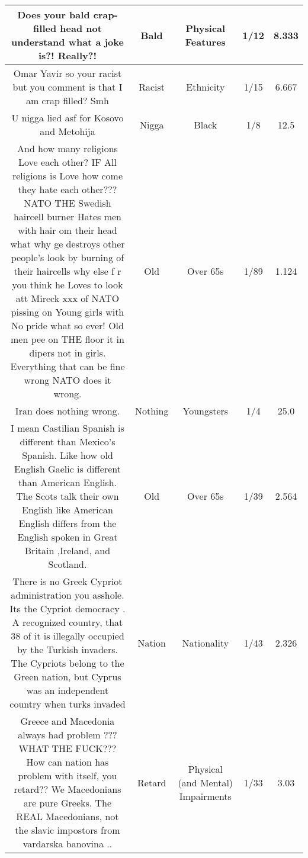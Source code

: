 \documentclass[11pt]{article}
\newlength\mylength
\begin{document}
\begin{center}
\begin{longtable}{|C{.40\mylength}|C{.30\mylength}|C{.15\mylength}|C{.15\mylength}|C{.15\mylength}|}
  Does your bald crap-filled head not understand what a joke is?!   Really?!  & Bald & Physical Features & 1/12 & 8.333 \\  \hline
  Omar Yavir so your racist but you comment is that I am crap filled?  Smh  & Racist & Ethnicity & 1/15 & 6.667 \\  \hline
  U nigga lied asf for Kosovo and Metohija  & Nigga & Black & 1/8 & 12.5 \\  \hline
  And how many religions Love each other? IF All religions is Love how come they hate each other??? NATO   THE Swedish haircell burner Hates men with hair om their head what why ge destroys other people's look by burning of their haircells why else f r you think he Loves to look att Mireck xxx of NATO pissing on Young girls with No pride what so ever! Old men pee on THE floor it in dipers not in girls. Everything that can be fine wrong NATO does it wrong.  & Old & Over 65s & 1/89 & 1.124 \\  \hline
  Iran does nothing wrong.  & Nothing & Youngsters & 1/4 & 25.0 \\  \hline
  I mean Castilian Spanish is different than Mexico's Spanish. Like how old English Gaelic is different than American English. The Scots talk their own English like American English differs from the English spoken in Great Britain ,Ireland, and Scotland.  & Old & Over 65s & 1/39 & 2.564 \\  \hline
  There is no  Greek Cypriot administration  you asshole. Its the  Cypriot democracy  . A recognized country, that 38  of it is illegally occupied by the Turkish invaders. The Cypriots belong to the Green nation, but Cyprus was an independent country when turks invaded  & Nation & Nationality & 1/43 & 2.326 \\  \hline
   Greece and Macedonia always had problem ??? WHAT THE FUCK??? How can nation has problem with itself, you retard?? We Macedonians are pure Greeks. The REAL Macedonians, not the slavic impostors from  vardarska banovina ..  & Retard & Physical (and Mental) Impairments & 1/33 & 3.03 \\  \hline

\end{longtable}
\end{center}
\end{document}
